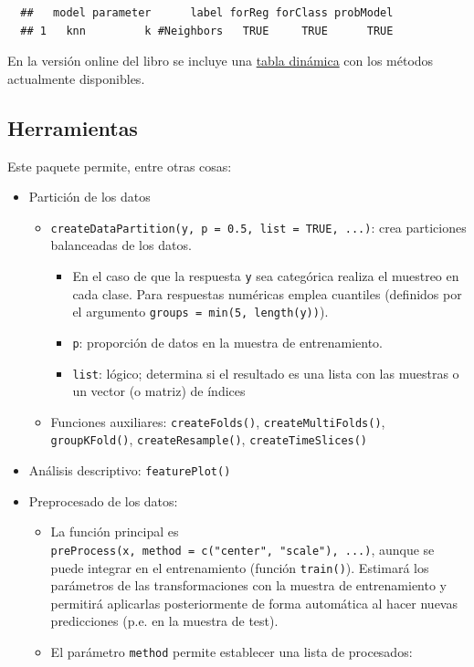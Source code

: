 \documentclass[
]{book}
\theoremstyle{break}
\theoremstyle{nonumberplain}
\begin{document}
\begin{verbatim}
  ##   model parameter      label forReg forClass probModel
  ## 1   knn         k #Neighbors   TRUE     TRUE      TRUE
\end{verbatim}

En la versión online del libro se incluye una \href{https://rubenfcasal.github.io/aprendizaje_estadistico/caret.html}{tabla dinámica} con los métodos actualmente disponibles.

\hypertarget{herramientas}{%
\subsection{Herramientas}\label{herramientas}}

Este paquete permite, entre otras cosas:

\begin{itemize}
\item
  Partición de los datos

  \begin{itemize}
  \item
    \texttt{createDataPartition(y,\ p\ =\ 0.5,\ list\ =\ TRUE,\ ...)}: crea particiones balanceadas de los datos.

    \begin{itemize}
    \item
      En el caso de que la respuesta \texttt{y} sea categórica realiza el muestreo en cada clase.
      Para respuestas numéricas emplea cuantiles (definidos por el argumento \texttt{groups\ =\ min(5,\ length(y))}).
    \item
      \texttt{p}: proporción de datos en la muestra de entrenamiento.
    \item
      \texttt{list}: lógico; determina si el resultado es una lista con las muestras o un vector (o matriz) de índices
    \end{itemize}
  \item
    Funciones auxiliares: \texttt{createFolds()}, \texttt{createMultiFolds()}, \texttt{groupKFold()}, \texttt{createResample()}, \texttt{createTimeSlices()}
  \end{itemize}
\item
  Análisis descriptivo: \texttt{featurePlot()}
\item
  Preprocesado de los datos:

  \begin{itemize}
  \item
    La función principal es \texttt{preProcess(x,\ method\ =\ c("center",\ "scale"),\ ...)}, aunque se puede integrar en el entrenamiento (función \texttt{train()}). Estimará los parámetros de las transformaciones con la muestra de entrenamiento y permitirá aplicarlas posteriormente de forma automática al hacer nuevas predicciones (p.e. en la muestra de test).
  \item
    El parámetro \texttt{method} permite establecer una lista de procesados:


\end{itemize}
\end{itemize}
\end{document}
